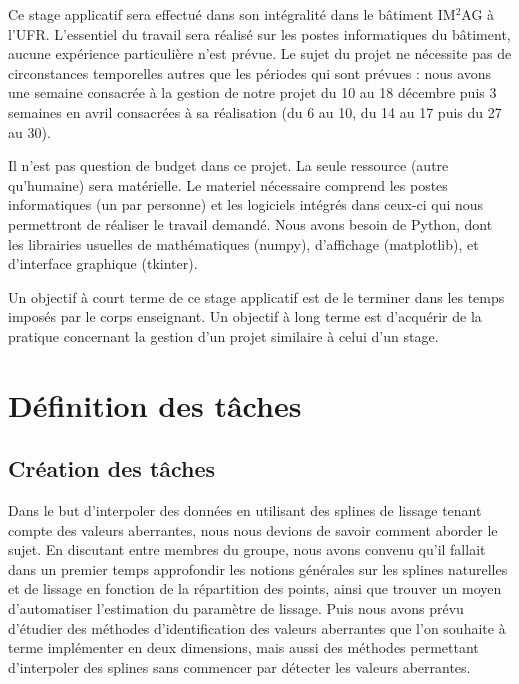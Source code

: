 \documentclass[a4paper,12pt]{article} %
\begin{document}
Ce stage applicatif sera effectué dans son intégralité dans le bâtiment IM$^2$AG à l’UFR. L’essentiel du travail sera réalisé sur les postes informatiques du bâtiment, aucune expérience particulière n’est prévue.
Le sujet du projet ne nécessite pas de circonstances temporelles autres que les périodes qui sont prévues : nous avons une semaine consacrée à la gestion de notre projet du 10 au 18 décembre puis 3 semaines en avril consacrées à sa réalisation (du 6 au 10, du 14 au 17 puis du 27 au 30).

Il n’est pas question de budget dans ce projet. La seule ressource (autre qu'humaine) sera matérielle. Le materiel nécessaire comprend les postes informatiques (un par personne) et les logiciels intégrés dans ceux-ci qui nous permettront de réaliser le travail demandé. Nous avons besoin de Python, dont les librairies usuelles de mathématiques (numpy), d'affichage (matplotlib), et d'interface graphique (tkinter).

Un objectif à court terme de ce stage applicatif est de le terminer dans les temps imposés par le corps enseignant. Un objectif à long terme est d’acquérir de la pratique concernant la gestion d’un projet similaire à celui d’un stage.

\newpage
\section{Définition des tâches}

	\subsection{Création des tâches}
	Dans le but d'interpoler des données en utilisant des splines de lissage tenant compte des valeurs aberrantes, nous nous devions de savoir comment aborder le sujet. En discutant entre membres du groupe, nous avons convenu qu'il fallait dans un premier temps approfondir les notions générales sur les splines naturelles et de lissage en fonction de la répartition des points, ainsi que trouver un moyen d'automatiser l'estimation du paramètre de lissage. Puis nous avons prévu d'étudier des méthodes d'identification des valeurs aberrantes que l'on souhaite à terme implémenter en deux dimensions, mais aussi des méthodes permettant d'interpoler des splines sans commencer par détecter les valeurs aberrantes.
\end{document}
